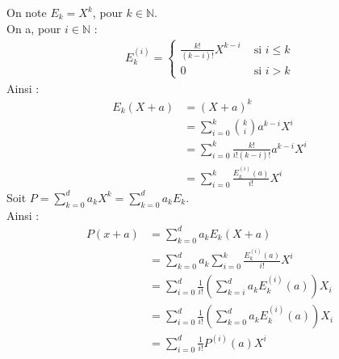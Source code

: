 \documentclass[../main.tex]{subfiles}
\begin{document}
\noindent On note $E_k = X^k$, pour $k \in \mathbb{N}$. \\
On a, pour $i \in \mathbb{N}$ : 
\begin{align*}
    E_k^{(i)} = \begin{cases}
        \frac{k!}{(k-i)!}X^{k-i} & \text{ si } i \leq k \\
        0 & \text{ si } i > k
    \end{cases}
\end{align*}
Ainsi : 
\begin{align*}
    E_k(X + a) &= (X + a)^k \\
    &= \sum_{i=0}^{k} \binom{k}{i} a^{k-i} X^i \\
    &= \sum_{i=0}^{k} \frac{k!}{i!(k-i)!} a^{k-i} X^i \\
    &= \sum_{i=0}^{k} \frac{E_k^{(i)}(a)}{i!} X^i
\end{align*}
Soit $P = \sum\limits_{k=0}^{d} a_k X^k = \sum_{k=0}^{d} a_k E_k$. \\
Ainsi :
\begin{align*}
    P(x + a) &= \sum_{k=0}^{d} a_k E_k(X + a) \\
    &= \sum_{k=0}^{d} a_k \sum_{i=0}^{k} \frac{E_k^{(i)}(a)}{i!} X^i \\
    &= \sum_{i=0}^{d} \frac{1}{i!} \left( \sum_{k=i}^{d} a_k E_k^{(i)}(a) \right) X_i \\
    &= \sum_{i=0}^{d} \frac{1}{i!} \left( \sum_{k=0}^{d} a_k E_k^{(i)}(a) \right) X_i \\
    &= \sum_{i=0}^{d} \frac{1}{i!} P^{(i)}(a) X^i
\end{align*}
\end{document}
